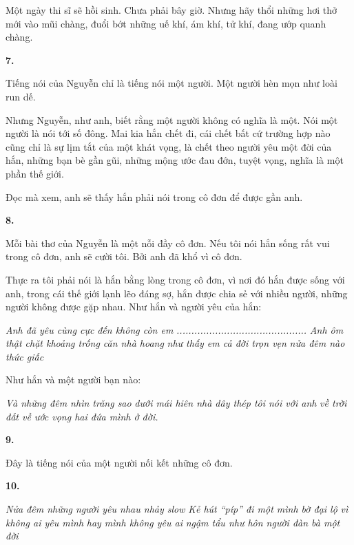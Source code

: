 \documentclass[../main.tex]{subfiles}
\begin{document}
\begin{multicols}{2}
Một ngày thi sĩ sẽ hồi sinh. Chưa phải bây giờ. Nhưng hãy thổi những hơi thở mới vào mũi chàng, đuổi bớt những uế khí, ám khí, tử khí, đang ướp quanh chàng.  
 
 
\textbf{7.} 
 
Tiếng nói của Nguyễn chỉ là tiếng nói một người. Một người hèn mọn như loài run dế. 
 
Nhưng Nguyễn, như anh, biết rằng một người không có nghĩa là một. Nói một người là nói tới số đông. Mai kia hắn chết đi, cái chết bất cứ trường hợp nào cũng chỉ là sự lịm tắt của một khát vọng, là chết theo người yêu một đời của hắn, những bạn bè gần gũi, những mộng ước đau đớn, tuyệt vọng, nghĩa là một phần thế giới. 
 
Đọc mà xem, anh sẽ thấy hắn phải nói trong cô đơn để được gần anh. 
 
 
\textbf{8.} 
 
Mỗi bài thơ của Nguyễn là một nỗi đầy cô đơn. Nếu tôi nói hắn sống rất vui trong cô đơn, anh sẽ cười tôi. Bởi anh đã khổ vì cô đơn. 
 
Thực ra tôi phải nói là hắn bằng lòng trong cô đơn, vì nơi đó hắn được sống với anh, trong cái thế giới lạnh lẽo đáng sợ, hắn được chia sẻ với nhiều người, những người không được gặp nhau. Như hắn và người yêu của hắn:        
\begin{blockquote}
        
\textit{Anh đã yêu cùng cực}        
\textit{đến không còn em }        
\textit{............................................}        
\textit{Anh ôm thật chặt khoảng trống căn nhà hoang}        
\textit{như thấy em cả đời trọn vẹn } 
\textit{nửa đêm nào thức giấc} 

\end{blockquote}
 
Như hắn và một người bạn nào:        
\begin{blockquote}
        
\textit{Và những đêm nhìn trăng sao}        
\textit{dưới mái hiên nhà dây thép tôi nói với anh }        
\textit{về trời đất về ước vọng hai đứa mình ở đời.}        

\end{blockquote}
 
\textbf{9.} 
 
Đây là tiếng nói của một người nối kết những cô đơn.        
        
 
\textbf{10.}        
\begin{blockquote}
        
\textit{Nửa đêm những người yêu nhau nhảy slow }        
\textit{Kẻ hút “píp” đi một mình bờ đại lộ}        
\textit{vì không ai yêu mình}        
\textit{hay mình không yêu ai} 
\textit{ngậm tẩu như hôn người đàn bà một đời } 


\end{blockquote}
\end{multicols}
\end{document}
